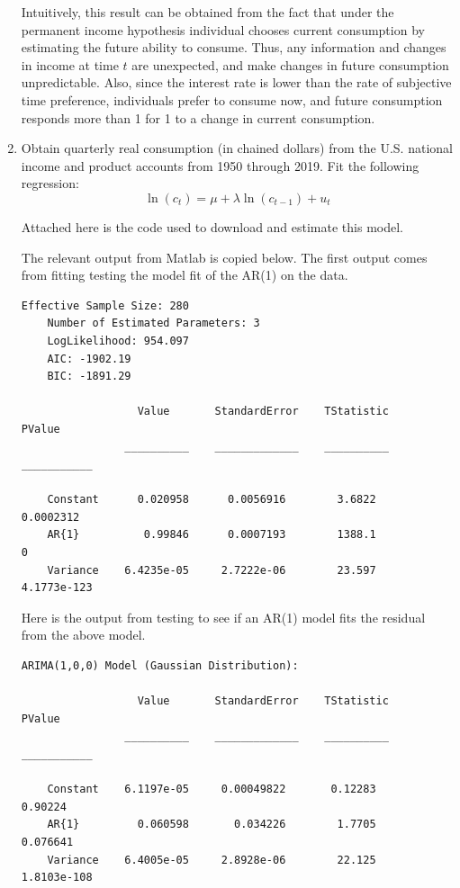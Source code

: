 \documentclass[11pt]{article}
\begin{document}
\begin{enumerate}
Intuitively, this result can be obtained from the fact that under the permanent income hypothesis individual chooses current consumption by estimating the future ability to consume. Thus, any information and changes in income at time $t$ are unexpected, and make changes in future consumption unpredictable. Also, since the interest rate is lower than the rate of subjective time preference, individuals prefer to consume now, and future consumption responds more than 1 for 1 to a change in current consumption.

\newpage
\item  Obtain quarterly real consumption (in chained dollars) from the U.S.
national income and product accounts from 1950 through 2019. Fit the following
regression:
\[
\ln(c_t) = \mu + \lambda \ln(c_{t-1}) + u_t
\]

Attached here is the code used to download and estimate this model.



The relevant output from Matlab is copied below.
The first output comes from fitting testing the model fit of the AR(1) on the data.
\begin{lstlisting}[caption={Matlab output from AR(1) model on data}, label=lst:data-output]
    Effective Sample Size: 280
    Number of Estimated Parameters: 3
    LogLikelihood: 954.097
    AIC: -1902.19
    BIC: -1891.29
 
                  Value       StandardError    TStatistic      PValue   
                __________    _____________    __________    ___________

    Constant      0.020958      0.0056916        3.6822        0.0002312
    AR{1}          0.99846      0.0007193        1388.1                0
    Variance    6.4235e-05     2.7222e-06        23.597      4.1773e-123
\end{lstlisting}

Here is the output from testing to see if an AR(1) model fits the residual from the above model.
\begin{lstlisting}[caption={Matlab output from AR(1) model on residuals}, label=lst:resid-output]
    ARIMA(1,0,0) Model (Gaussian Distribution):
 
                  Value       StandardError    TStatistic      PValue   
                __________    _____________    __________    ___________

    Constant    6.1197e-05     0.00049822       0.12283          0.90224
    AR{1}         0.060598       0.034226        1.7705         0.076641
    Variance    6.4005e-05     2.8928e-06        22.125      1.8103e-108
\end{lstlisting}


\end{enumerate}
\end{document}
